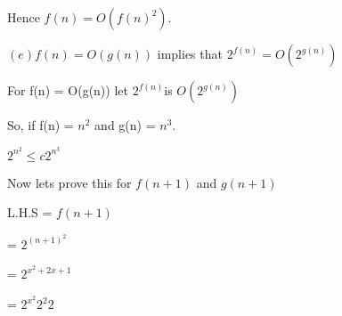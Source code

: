 \documentclass[letterpaper,portrait,12pt]{article}
\begin{document}
\begin{flushleft}
Hence $f (n) = O(f (n)^2 )$.
\end{flushleft}


\begin{flushleft}

\end{flushleft}


\begin{flushleft}
$(e) f (n) = O(g(n))$ implies that $2^{f (n)} = O(2^{g(n)} )$
\end{flushleft}


\begin{flushleft}
For f(n) = O(g(n)) let $2^{f(n)}$is $O(2^{g(n)})$
\end{flushleft}


\begin{flushleft}
So, if f(n) = $n^2$ and g(n) = $n^3$.
\end{flushleft}


\begin{flushleft}

\end{flushleft}


\begin{flushleft}
$2^{n^2} \le c  2^{n^3}$
\end{flushleft}


\begin{flushleft}

\end{flushleft}


\begin{flushleft}
Now lets prove this for $f(n+1)$ and $g(n+1)$
\end{flushleft}


\begin{flushleft}

\end{flushleft}


\begin{flushleft}
L.H.S  = $f(n+1)$
\end{flushleft}


\begin{flushleft}
	= $2^{(n+1)^2}$
\end{flushleft}


\begin{flushleft}
	= $2^{x^2+2x+1}$
\end{flushleft}


\begin{flushleft}
	= $2^{x^2} 2^2 2$
\end{flushleft}
\end{document}
